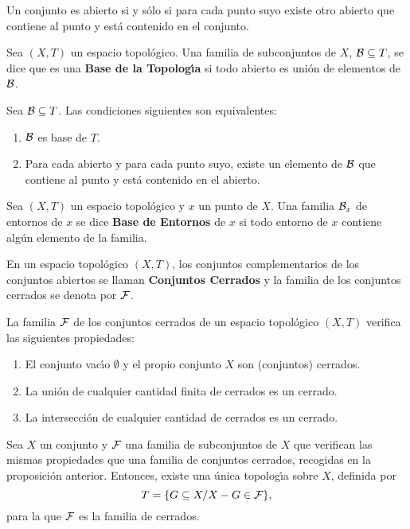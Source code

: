 \documentclass[cursovd_portada.tex]{subfiles}
\begin{document}
\begin{prop}
Un conjunto es abierto si y s\'{o}lo si para cada punto suyo existe otro abierto que contiene al punto y est\'{a}
contenido en el conjunto.
\end{prop}
\begin{defi}
Sea $(X,T)$ un espacio topol\'{o}gico. Una familia de subconjuntos de $X$, ${\cal B}\subseteq T$, se dice que es una
{\bf Base de la Topolog\'{\i}a} si todo abierto es uni\'{o}n de elementos de ${\cal B}$.
\end{defi}
\begin{teorema}
Sea ${\cal B}\subseteq T$. Las condiciones siguientes son equivalentes:
\begin{enumerate}
\item ${\cal B}$ es base de $T$.
\item Para cada abierto y para cada punto suyo, existe un elemento de ${\cal B}$ que contiene al punto y est\'{a}
contenido en el abierto.
\end{enumerate}
\end{teorema}
\begin{defi}
Sea $(X,T)$ un espacio topol\'{o}gico y $x$ un punto de $X$. Una familia ${\cal B}_x$ de entornos de $x$ se dice {\bf
Base de Entornos} de $x$ si todo entorno de $x$ contiene alg\'{u}n elemento de la familia.
\end{defi}
\begin{defi}
En un espacio topol\'{o}gico $(X,T)$, los conjuntos complementarios de los conjuntos abiertos se llaman {\bf Conjuntos
Cerrados} y la familia de los conjuntos cerrados se denota por ${\cal F}$.
\end{defi}
\begin{prop}
La familia ${\cal F}$ de los conjuntos cerrados de un espacio to\-po\-l\'{o}\-gi\-co $(X,T)$ verifica las siguientes
propiedades:
\begin{enumerate}
\item El conjunto vac\'{\i}o $\emptyset$ y el propio conjunto $X$ son (conjuntos) cerrados.
\item La uni\'{o}n de cualquier cantidad finita de cerrados es un cerrado.
\item La intersecci\'{o}n de cualquier cantidad de cerrados es un cerrado.
\end{enumerate}
\end{prop}
\begin{teorema}
Sea $X$ un conjunto y ${\cal F}$ una familia de subconjuntos de $X$ que verifican las mismas propiedades que una
familia de conjuntos cerrados, recogidas en la proposici\'{o}n anterior. Entonces, existe una \'{u}nica topolog\'{\i}a sobre
$X$, definida por
$$T=\{G\subseteq X/X-G\in{\cal F}\},$$
para la que ${\cal F}$ es la familia de cerrados.
\end{teorema}
\end{document}
